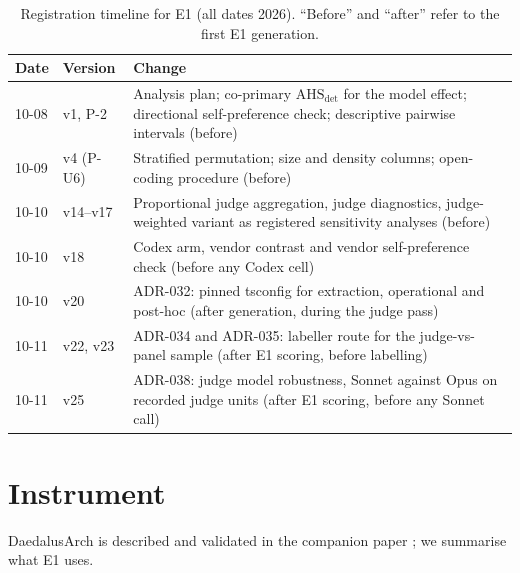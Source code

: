 \documentclass[10pt,a4paper]{article}
\newcommand{\tool}{DaedalusArch}
\newcommand{\AHSd}{\mathrm{AHS}_{\mathrm{det}}}
\begin{document}
\begin{table}[t]
\centering\small
\caption{Registration timeline for E1 (all dates 2026). ``Before'' and ``after'' refer to the first E1 generation.}
\label{tab:timeline}
\begin{tabularx}{\linewidth}{@{}llX@{}}
\toprule
Date & Version & Change \\
\midrule
10-08 & v1, P-2 & Analysis plan; co-primary $\AHSd$ for the model effect; directional self-preference check; descriptive pairwise intervals (before) \\
10-09 & v4 (P-U6) & Stratified permutation; size and density columns; open-coding procedure (before) \\
10-10 & v14--v17 & Proportional judge aggregation, judge diagnostics, judge-weighted variant as registered sensitivity analyses (before) \\
10-10 & v18 & Codex arm, vendor contrast and vendor self-preference check (before any Codex cell) \\
10-10 & v20 & ADR-032: pinned tsconfig for extraction, operational and post-hoc (after generation, during the judge pass) \\
10-11 & v22, v23 & ADR-034 and ADR-035: labeller route for the judge-vs-panel sample (after E1 scoring, before labelling) \\
10-11 & v25 & ADR-038: judge model robustness, Sonnet against Opus on recorded judge units (after E1 scoring, before any Sonnet call) \\
\bottomrule
\end{tabularx}
\end{table}

\section{Instrument}\label{sec:instrument}

\tool{} is described and validated in the companion paper \cite{daedalus2026tool}; we summarise what E1 uses.
\end{document}
